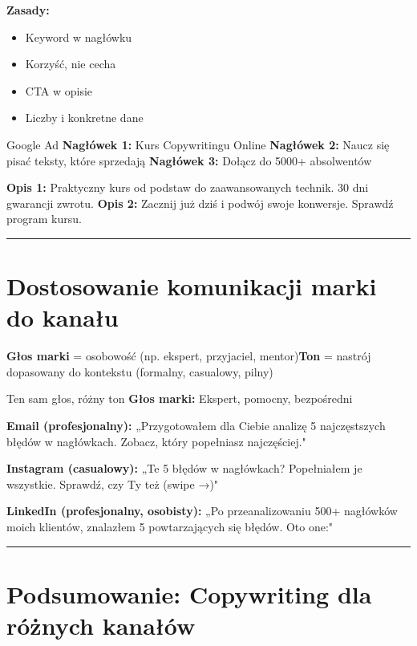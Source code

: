 \documentclass[
  12pt,
  a4paper,
  twoside,
  openright,
  12pt,
  DIV=12,
  BCOR=12mm]{scrbook}
\providecommand{\tightlist}{%
  \setlength{\itemsep}{0pt}\setlength{\parskip}{0pt}}\usepackage{longtable,booktabs,array}
\newcommand{\decoline}{%
  \begin{center}
    \textcolor{bordergray}{\rule{0.3\textwidth}{0.5pt}}
  \end{center}
}
\begin{document}
\textbf{Zasady:}

\begin{itemize}
\tightlist
\item
  Keyword w nagłówku
\item
  Korzyść, nie cecha
\item
  CTA w opisie
\item
  Liczby i konkretne dane
\end{itemize}

\begin{przyklad}{Google Ad}
\textbf{Nagłówek 1:} Kurs Copywritingu Online\newline
\textbf{Nagłówek 2:} Naucz się pisać teksty, które sprzedają\newline
\textbf{Nagłówek 3:} Dołącz do 5000+ absolwentów

\textbf{Opis 1:} Praktyczny kurs od podstaw do zaawansowanych technik. 30 dni gwarancji zwrotu.\newline
\textbf{Opis 2:} Zacznij już dziś i podwój swoje konwersje. Sprawdź program kursu.
\end{przyklad}

\decoline

\section{Dostosowanie komunikacji marki do
kanału}\label{dostosowanie-komunikacji-marki-do-kanaux142u}

\textbf{Głos marki} = osobowość (np. ekspert, przyjaciel,
mentor)\newline \textbf{Ton} = nastrój dopasowany do kontekstu
(formalny, casualowy, pilny)

\begin{przyklad}{Ten sam głos, różny ton}
\textbf{Głos marki:} Ekspert, pomocny, bezpośredni

\textbf{Email (profesjonalny):}
„Przygotowałem dla Ciebie analizę 5 najczęstszych błędów w nagłówkach. Zobacz, który popełniasz najczęściej."

\textbf{Instagram (casualowy):}
„Te 5 błędów w nagłówkach? Popełniałem je wszystkie. Sprawdź, czy Ty też (swipe →)"

\textbf{LinkedIn (profesjonalny, osobisty):}
„Po przeanalizowaniu 500+ nagłówków moich klientów, znalazłem 5 powtarzających się błędów. Oto one:"
\end{przyklad}

\decoline

\section{Podsumowanie: Copywriting dla różnych
kanałów}\label{podsumowanie-copywriting-dla-ruxf3ux17cnych-kanaux142uxf3w}
\end{document}
